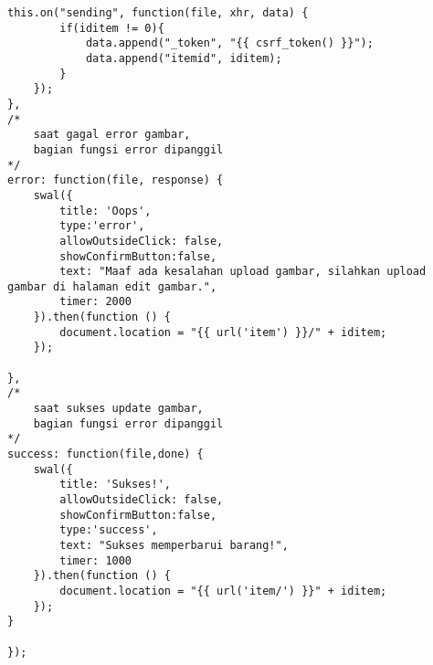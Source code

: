 \begin{lstlisting}[label=cdjq.03-02,style=htmlcssjs,caption=Implementasi \textit{View} Memperbarui Barang]
	this.on("sending", function(file, xhr, data) {
	    if(iditem != 0){
	        data.append("_token", "{{ csrf_token() }}");
	        data.append("itemid", iditem);
	    }
	});
},
/*	
	saat gagal error gambar,
	bagian fungsi error dipanggil
*/
error: function(file, response) {
    swal({
        title: 'Oops',
        type:'error',
        allowOutsideClick: false,
        showConfirmButton:false,
        text: "Maaf ada kesalahan upload gambar, silahkan upload gambar di halaman edit gambar.",
        timer: 2000
    }).then(function () {
        document.location = "{{ url('item') }}/" + iditem;
    });

},
/*	
	saat sukses update gambar,
	bagian fungsi error dipanggil
*/
success: function(file,done) {
    swal({
        title: 'Sukses!',
        allowOutsideClick: false,
        showConfirmButton:false,
        type:'success',
        text: "Sukses memperbarui barang!",
        timer: 1000
    }).then(function () {
        document.location = "{{ url('item/') }}" + iditem;
    });
}

});

\end{lstlisting}


